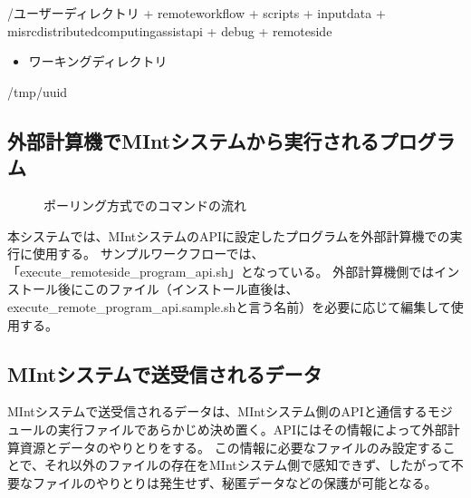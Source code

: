 \documentclass[letterpaper,10pt,dvipdfmx,openany]{sphinxmanual}
\begin{document}
\begin{sphinxVerbatim}[commandchars=\\\{\}]
\PYGZti{}/ユーザーディレクトリ
  + remote\PYGZus{}workflow
    + scripts
      + input\PYGZus{}data
  + misrc\PYGZus{}distributed\PYGZus{}computing\PYGZus{}assist\PYGZus{}api
    + debug
      + remote\PYGZhy{}side
\end{sphinxVerbatim}
\begin{itemize}
\item {} 
ワーキングディレクトリ

\end{itemize}

\begin{sphinxVerbatim}[commandchars=\\\{\}]
/tmp/\PYGZlt{}uuid\PYGZgt{}
\end{sphinxVerbatim}


\subsection{外部計算機でMIntシステムから実行されるプログラム}
\label{\detokenize{using_distributed_properties:id22}}
\begin{figure}[htbp]
\centering
\capstart

\caption{ポーリング方式でのコマンドの流れ}\label{\detokenize{using_distributed_properties:id48}}\end{figure}

本システムでは、MIntシステムのAPIに設定したプログラムを外部計算機での実行に使用する。
サンプルワークフローでは、「execute\_remote\sphinxhyphen{}side\_program\_api.sh」となっている。
外部計算機側ではインストール後にこのファイル（インストール直後は、execute\_remote\_program\_api.sample.shと言う名前）を必要に応じて編集して使用する。


\subsection{MIntシステムで送受信されるデータ}
\label{\detokenize{using_distributed_properties:id23}}
MIntシステムで送受信されるデータは、MIntシステム側のAPIと通信するモジュールの実行ファイルであらかじめ決め置く。APIにはその情報によって外部計算資源とデータのやりとりをする。
この情報に必要なファイルのみ設定することで、それ以外のファイルの存在をMIntシステム側で感知できず、したがって不要なファイルのやりとりは発生せず、秘匿データなどの保護が可能となる。
\end{document}
